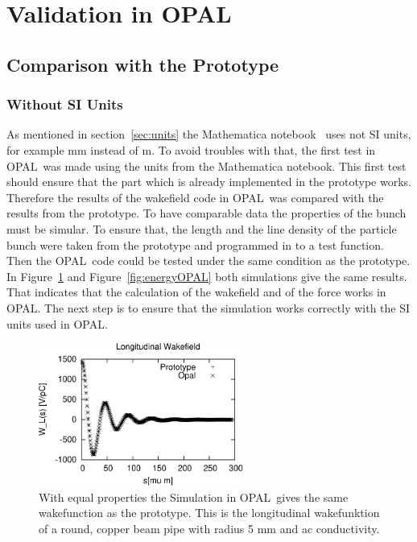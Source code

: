 \documentclass[11pt,a4paper]{article}
\newcommand{\opal}{\textsc{OPAL}}
\begin{document}
\section{Validation in \opal}
\subsection{Comparison with the Prototype}
\subsubsection{Without SI Units}
As mentioned in section~\ref{sec:units} the Mathematica notebook~\cite{notebook} uses not SI units, for example mm instead of m. To avoid troubles with that, the first test in \opal\ was made using the units from the Mathematica notebook. This first test should ensure that the part which is already implemented in the prototype works. Therefore the results of the wakefield code in \opal\ was compared with the results from the prototype. To have comparable data the properties of the bunch must be simular. To ensure that, the length and the line density  of the particle bunch were taken from the prototype and programmed in to a test function. Then the \opal\ code could be tested under the same condition as the prototype. In Figure~\ref{fig:wakeOPAL} and Figure~\ref{fig:energyOPAL} both simulations give the same results. That indicates that the calculation of the wakefield and of the force works in \opal. The next step is to ensure that the simulation works correctly with the SI units used in \opal.
\begin{figure}[htb]
\begin{center}
\includegraphics[width=0.6\textwidth]{wakeCompare/wake_Lo_Circ_Cu_AC_5_OPAL.pdf} 
\caption{With equal properties the Simulation in \opal\ gives the same wakefunction as the prototype. This is the longitudinal wakefunktion of a round, copper beam pipe with radius 5 mm and ac conductivity.
\label{fig:wakeOPAL} }
\end{center}
\end{figure}
\end{document}
